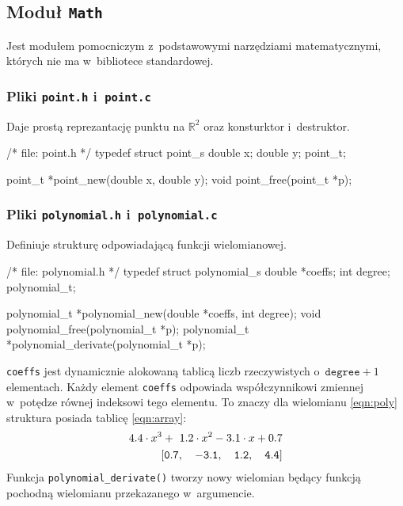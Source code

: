 \documentclass[12pt,a4paper]{article}
\newcommand{\p}[1]{\texttt{#1}}
\begin{document}
\subsection{Moduł \p{Math}}
\label{sec:modul_math}

Jest modułem pomocniczym z~podstawowymi narzędziami matematycznymi, których nie
ma w~bibliotece standardowej.

\subsubsection{Pliki \p{point.h} i~\p{point.c}}
Daje prostą reprezantację punktu na $\mathbb{R}^{2}$ oraz konsturktor i~destruktor.
\begin{SmallVerbatim}
    /* file: point.h */
    typedef struct point_s {
      double x;
      double y;
    } point_t;
    
    point_t *point_new(double x, double y);
    void point_free(point_t *p);
\end{SmallVerbatim}

\subsubsection{Pliki \p{polynomial.h} i~\p{polynomial.c}}
Definiuje strukturę odpowiadającą funkcji wielomianowej.
\begin{SmallVerbatim}
    /* file: polynomial.h */
    typedef struct polynomial_s {
      double *coeffs;
      int degree;
    } polynomial_t;
    
    polynomial_t *polynomial_new(double *coeffs, int degree);
    void polynomial_free(polynomial_t *p);
    polynomial_t *polynomial_derivate(polynomial_t *p);
\end{SmallVerbatim}
\p{coeffs} jest dynamicznie alokowaną tablicą liczb rzeczywistych
o~$\p{degree}+1$ elementach. Każdy element \p{coeffs} odpowiada współczynnikowi
zmiennej w~potędze równej indeksowi tego elementu. To znaczy dla wielomianu
\ref{eqn:poly} struktura posiada tablicę \ref{eqn:array}:
\begin{eqnarray}
  4.4 \cdot x^{3} +~1.2 \cdot x^2 - 3.1 \cdot x + 0.7 \label{eqn:poly}\\
  {\tt\left[ 0.7,\quad -3.1,\quad 1.2, \quad 4.4 \right]} \label{eqn:array}
\end{eqnarray}
Funkcja \p{polynomial\_derivate()} tworzy nowy wielomian będący funkcją
pochodną wielomianu przekazanego w~argumencie.
\end{document}
